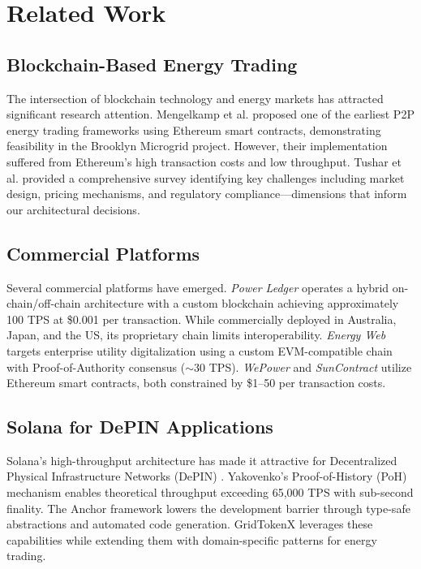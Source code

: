\documentclass[conference]{IEEEtran}
\begin{document}
\section{Related Work}
\label{sec:related}

\subsection{Blockchain-Based Energy Trading}

The intersection of blockchain technology and energy markets has attracted significant research attention. Mengelkamp et al. \cite{mengelkamp2018} proposed one of the earliest P2P energy trading frameworks using Ethereum smart contracts, demonstrating feasibility in the Brooklyn Microgrid project. However, their implementation suffered from Ethereum's high transaction costs and low throughput. Tushar et al. \cite{tushar2020} provided a comprehensive survey identifying key challenges including market design, pricing mechanisms, and regulatory compliance---dimensions that inform our architectural decisions.

\subsection{Commercial Platforms}

Several commercial platforms have emerged. \textit{Power Ledger} \cite{powerledger} operates a hybrid on-chain/off-chain architecture with a custom blockchain achieving approximately 100 TPS at \$0.001 per transaction. While commercially deployed in Australia, Japan, and the US, its proprietary chain limits interoperability. \textit{Energy Web} \cite{energyweb} targets enterprise utility digitalization using a custom EVM-compatible chain with Proof-of-Authority consensus ($\sim$30 TPS). \textit{WePower} \cite{wepower} and \textit{SunContract} \cite{suncontract} utilize Ethereum smart contracts, both constrained by \$1--50 per transaction costs.

\subsection{Solana for DePIN Applications}

Solana's high-throughput architecture has made it attractive for Decentralized Physical Infrastructure Networks (DePIN) \cite{depin}. Yakovenko's Proof-of-History (PoH) mechanism \cite{solana} enables theoretical throughput exceeding 65,000 TPS with sub-second finality. The Anchor framework \cite{anchor} lowers the development barrier through type-safe abstractions and automated code generation. GridTokenX leverages these capabilities while extending them with domain-specific patterns for energy trading.
\end{document}
